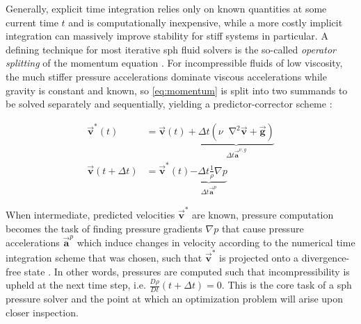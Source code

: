 \documentclass[conference]{IEEEtran}
\newcommand*\Laplace{\mathop{}\!\mathbin\nabla^2}
\newcommand\vek[1]{\vec{\bm{#1}}}
\newcommand\br[1]{\left(#1\right)}
\begin{document}
Generally, explicit time integration relies only on known quantities at some current time $t$ and is computationally inexpensive, while a more costly implicit integration can massively improve stability for stiff systems in particular. A defining technique for most iterative \ac{sph} fluid solvers is the so-called \textit{operator splitting} of the momentum equation \cite{survey2022}. For incompressible fluids of low viscosity, the much stiffer pressure accelerations dominate viscous accelerations while gravity is constant and known, so \autoref{eq:momentum} is split into two summands to be solved separately and sequentially, yielding a predictor-corrector scheme \cite{survey2022}:

\begin{equation}\label{eq:operator-split-vel}
  \begin{aligned}
    \vek{v}^*(t) &= \vek{v}(t) +\underbrace{ \Delta t \br{\nu \Laplace \vek{v} + \vek{g}}}_{ \Delta t \vek{a}^{\nu,g}}\\
    \vek{v}\br{t + \Delta t} &= \vek{v}^*(t) \underbrace{- \Delta t \frac{1}{\rho}\nabla p}_{\Delta t \vek{a}^p}
  \end{aligned}
\end{equation}

When intermediate, predicted velocities $\vek{v}^*$ are known, pressure computation becomes the task of finding pressure gradients $\nabla p$ that cause pressure accelerations $\vek{a}^p$ which induce changes in velocity according to the numerical time integration scheme that was chosen, such that $\vek{v}^*$ is projected onto a divergence-free state \cite{survey2022}. In other words, pressures are computed such that incompressibility is upheld at the next time step, i.e. $\frac{D\rho}{Dt}\br{t+\Delta t}=0$. This is the core task of a \ac{sph} pressure solver and the point at which an optimization problem will arise upon closer inspection. 






\end{document}
